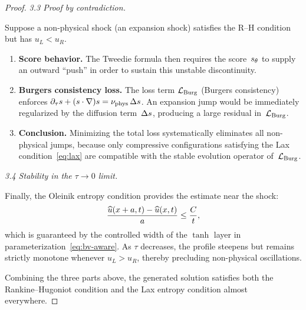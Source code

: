 \begin{proof}
\smallskip
\noindent\textit{3.3  Proof by contradiction.}

Suppose a non-physical shock (an expansion shock) satisfies the R--H condition but has
$u_{L} < u_{R}$.

\begin{enumerate}
\item[\textbf{(i)}] \textbf{Score behavior.}
  The Tweedie formula then requires the score~$s_{\theta}$ to supply an outward ``push'' in order
  to sustain this unstable discontinuity.

\item[\textbf{(ii)}] \textbf{Burgers consistency loss.}
  The loss term $\mathcal{L}_{\mathrm{Burg}}$ (Burgers consistency) enforces
  $\partial_{\tau} s + (s\cdot\nabla)s = \nu_{\mathrm{phys}}\,\Delta s$.
  An expansion jump would be immediately regularized by the diffusion term~$\Delta s$,
  producing a large residual in~$\mathcal{L}_{\mathrm{Burg}}$.

\item[\textbf{(iii)}] \textbf{Conclusion.}
  Minimizing the total loss systematically eliminates all non-physical jumps, because only
  compressive configurations satisfying the Lax condition~\eqref{eq:lax} are compatible with
  the stable evolution operator of~$\mathcal{L}_{\mathrm{Burg}}$.
\end{enumerate}

\smallskip
\noindent\textit{3.4  Stability in the $\tau\to0$ limit.}

Finally, the Oleinik entropy condition provides the estimate near the shock:
\begin{equation}
\frac{\widehat{u}(x+a,t) - \widehat{u}(x,t)}{a} \le \frac{C}{t},
\end{equation}
which is guaranteed by the controlled width of the $\tanh$ layer in
parameterization~\eqref{eq:bv-aware}.
As $\tau$ decreases, the profile steepens but remains strictly monotone whenever $u_{L}>u_{R}$,
thereby precluding non-physical oscillations.

\medskip
\noindent
Combining the three parts above, the generated solution satisfies both the Rankine--Hugoniot
condition and the Lax entropy condition almost everywhere.
\end{proof}
